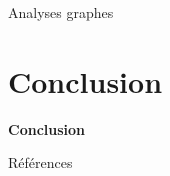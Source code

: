 \documentclass{backend/backend}
\begin{document}
\begin{frame}{Analyses}
    graphes
\end{frame}

\section*{Conclusion}
\begin{frame}{}
    \begin{center}
        \Huge
        \textbf{Conclusion}
    \end{center}
\end{frame}

\begin{frame}{Références}
    \tiny
    \printbibliography
\end{frame}
\end{document}
